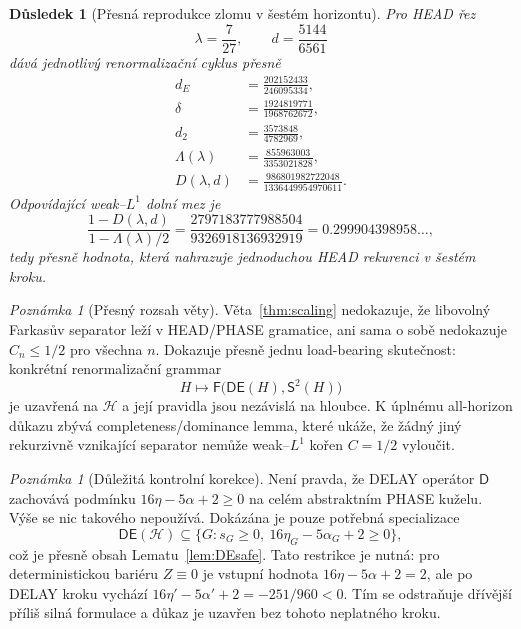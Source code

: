\documentclass[11pt,a4paper]{article}
\newtheorem{corollary}[theorem]{Důsledek}
\theoremstyle{remark}
\newtheorem{remark}[theorem]{Poznámka}
\newcommand{\HH}{\mathcal H}
\newcommand{\Eop}{\mathsf E}
\newcommand{\Dop}{\mathsf D}
\newcommand{\Sop}{\mathsf S}
\newcommand{\Fop}{\mathsf F}
\begin{document}
\begin{corollary}[Přesná reprodukce zlomu v šestém horizontu]\label{cor:n6}
Pro HEAD řez
\[
\lambda=\frac7{27},
\qquad
d=\frac{5144}{6561}
\]
dává jednotlivý renormalizační cyklus přesně
\begin{align*}
d_E&=\frac{202152433}{246095334},\\
\delta&=\frac{1924819771}{1968762672},\\
d_2&=\frac{3573848}{4782969},\\
\Lambda(\lambda)&=\frac{855963003}{3353021828},\\
D(\lambda,d)&=\frac{986801982722048}{1336449954970611}.
\end{align*}
Odpovídající weak--$L^1$ dolní mez je
\[
\frac{1-D(\lambda,d)}{1-\Lambda(\lambda)/2}
=\frac{2797183777988504}{9326918136932919}
=0.299904398958\ldots,
\]
tedy přesně hodnota, která nahrazuje jednoduchou HEAD rekurenci v šestém
kroku.
\end{corollary}

\begin{remark}[Přesný rozsah věty]
Věta~\ref{thm:scaling} nedokazuje, že libovolný Farkasův separator leží v
HEAD/PHASE gramatice, ani sama o sobě nedokazuje $C_n\le1/2$ pro všechna
$n$. Dokazuje přesně jednu load-bearing skutečnost: konkrétní
renormalizační grammar
\[
H\longmapsto \Fop\bigl(\Dop\Eop(H),\Sop^2(H)\bigr)
\]
je uzavřená na $\HH$ a její pravidla jsou nezávislá na hloubce. K úplnému
all-horizon důkazu zbývá completeness/dominance lemma, které ukáže, že žádný
jiný rekurzivně vznikající separator nemůže weak--$L^1$ kořen $C=1/2$
vyloučit.
\end{remark}

\begin{remark}[Důležitá kontrolní korekce]
Není pravda, že DELAY operátor $\Dop$ zachovává podmínku
$16\eta-5\alpha+2\ge0$ na celém abstraktním PHASE kuželu. Výše se nic
takového nepoužívá. Dokázána je pouze potřebná specializace
\[
\Dop\Eop(\HH)\subseteq
\{G:s_G\ge0,\ 16\eta_G-5\alpha_G+2\ge0\},
\]
což je přesně obsah Lematu~\ref{lem:DEsafe}. Tato restrikce je nutná:
pro deterministickou bariéru $Z\equiv0$ je vstupní hodnota
$16\eta-5\alpha+2=2$, ale po DELAY kroku vychází
$16\eta'-5\alpha'+2=-251/960<0$. Tím se odstraňuje dřívější příliš silná
formulace a důkaz je uzavřen bez tohoto neplatného kroku.
\end{remark}
\end{document}
